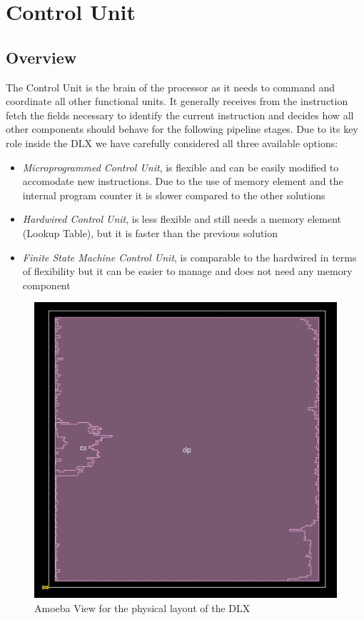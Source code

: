 \chapter{Control Unit}
\label{chap_cu}

\section{Overview}
The Control Unit is the brain of the processor as it needs to command and
coordinate all other functional units. It generally receives from the 
instruction fetch the fields necessary to identify the current instruction and
decides how all other components should behave for the following pipeline
stages. Due to its key role inside the DLX we have carefully considered all
three available options:
\begin{itemize}
	\item \textit{Microprogrammed Control Unit}, is flexible and can be 
		  easily modified to accomodate new instructions. Due to the use of 
		  memory element and the internal program counter it is slower compared 
		  to the other solutions
	\item \textit{Hardwired Control Unit}, is less flexible and still needs a
		  memory element (Lookup Table), but it is faster than the previous
		  solution
	\item \textit{Finite State Machine Control Unit}, is comparable to the
	      hardwired in terms of flexibility but it can be easier to manage
	      and does not need any memory component       
\end{itemize}
\begin{figure}[h]
	\centering
		\includegraphics[trim={0.65cm 0.45cm 0.48cm 
		0.37cm},clip=true,scale=0.8]{./Partition_DLX}
	\caption{Amoeba View for the physical layout of the DLX}
	\label{fig:aomeba_view}	
\end{figure}

